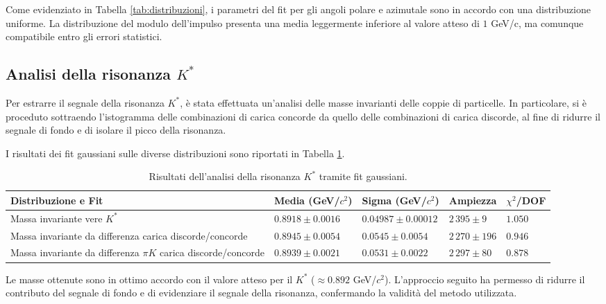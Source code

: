 \documentclass[a4paper,11pt]{article}
\begin{document}
Come evidenziato in Tabella \ref{tab:distribuzioni}, i parametri del fit per gli angoli polare e azimutale sono in accordo con una distribuzione uniforme. La distribuzione del modulo dell'impulso presenta una media leggermente inferiore al valore atteso di $1$ GeV/c, ma comunque compatibile entro gli errori statistici.

\subsection{Analisi della risonanza \( K^* \)}

Per estrarre il segnale della risonanza \( K^* \), è stata effettuata un'analisi delle masse invarianti delle coppie di particelle. In particolare, si è proceduto sottraendo l'istogramma delle combinazioni di carica concorde da quello delle combinazioni di carica discorde, al fine di ridurre il segnale di fondo e di isolare il picco della risonanza.

I risultati dei fit gaussiani sulle diverse distribuzioni sono riportati in Tabella \ref{tab:kstar}.

\begin{table}[h!]
    \centering
    \begin{tabular}{|m{2.5cm}|>{\centering\arraybackslash}m{2cm}|>{\centering\arraybackslash}m{2cm}|>{\centering\arraybackslash}m{2cm}|>{\centering\arraybackslash}m{1.5cm}|}
        \hline
        \textbf{Distribuzione e Fit} & \textbf{Media (GeV/$c^2$)} & \textbf{Sigma (GeV/$c^2$)} & \textbf{Ampiezza} & $\chi^2$/DOF \\
        \hline
        Massa invariante vere \( K^* \) & $0.8918 \pm 0.0016$ & $0.04987 \pm 0.00012$ & $2\,395 \pm 9$ & $1.050$ \\
        \hline
        Massa invariante da differenza carica discorde/concorde & $0.8945 \pm 0.0054$ & $0.0545 \pm 0.0054$ & $2\,270 \pm 196$ & $0.946$ \\
        \hline
        Massa invariante da differenza $\pi K$ carica discorde/concorde & $0.8939 \pm 0.0021$ & $0.0531 \pm 0.0022$ & $2\,297 \pm 80$ & $0.878$ \\
        \hline
    \end{tabular}
    \caption{Risultati dell'analisi della risonanza \( K^* \) tramite fit gaussiani.}
    \label{tab:kstar}
\end{table}

Le masse ottenute sono in ottimo accordo con il valore atteso per il \( K^* \) ($\approx 0.892$ GeV/$c^2$). L'approccio seguito ha permesso di ridurre il contributo del segnale di fondo e di evidenziare il segnale della risonanza, confermando la validità del metodo utilizzata.
\end{document}
